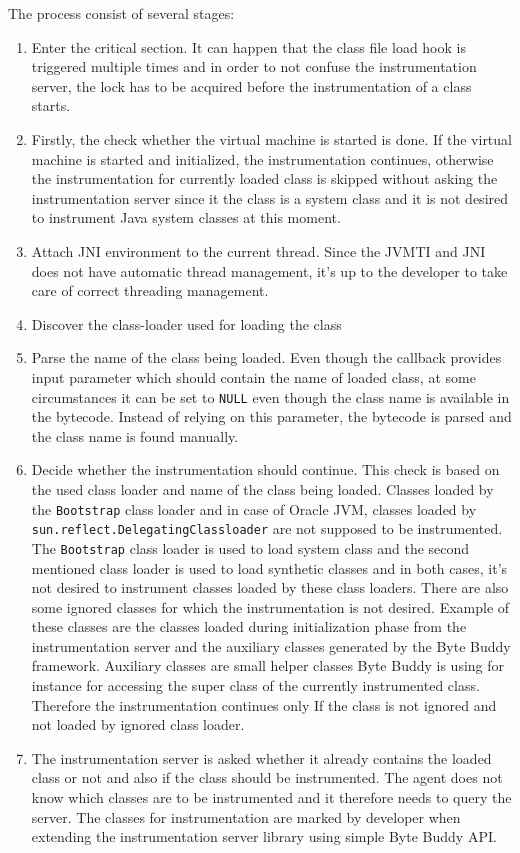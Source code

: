 The process consist of several stages:
\begin{enumerate}
	\item Enter the critical section. It can happen that the class file load hook is triggered multiple times and in order to not confuse the instrumentation server, the lock has to be acquired before the instrumentation of a class starts.
	\item Firstly, the check whether the virtual machine is started is done. If the virtual machine is started and initialized, the instrumentation continues, otherwise the instrumentation for currently loaded class is skipped without asking the instrumentation server since it the class is a system class and it is not desired to instrument Java system classes at this moment.
	\item Attach JNI environment to the current thread. Since the JVMTI and JNI does not have automatic thread management, it's up to the developer to take care of correct threading management.
	\item Discover the class-loader used for loading the class
	\item Parse the name of the class being loaded. Even though the callback provides input parameter which should contain the name of loaded class, at some circumstances it can be set to \texttt{NULL} even though the class name is available in the bytecode. Instead of relying on this parameter, the bytecode is parsed and the class name is found manually.
	\item Decide whether the instrumentation should continue. This check is based on the used class loader and name of the class being loaded. Classes loaded by the \texttt{Bootstrap} class loader and in case of Oracle JVM, classes loaded by \texttt{sun.reflect.DelegatingClassloader} are not supposed to be instrumented. 
	The \texttt{Bootstrap} class loader is used to load system class and the second mentioned class loader is used to load synthetic classes and in both cases, it's not desired to instrument classes loaded by these class loaders.
	There are also some ignored classes for which the instrumentation is not desired. Example of these classes are the classes loaded during initialization phase from the instrumentation server and the auxiliary classes generated by the Byte Buddy framework. Auxiliary classes are small helper classes Byte Buddy is using for instance for accessing the super class of the currently instrumented class. Therefore the instrumentation continues only If the class is not ignored and not loaded by ignored class loader.
	\item The instrumentation server is asked whether it already contains the loaded class or not and also if the class should be instrumented. The agent does not know which classes are to be instrumented and it therefore needs to query the server. The classes for instrumentation are marked by developer when extending the instrumentation server library using simple Byte Buddy API. 
	

\end{enumerate}
